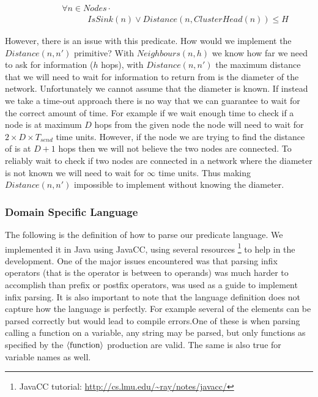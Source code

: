 \begin{align}
\label{eq:hcluster-distance-predicate}
& \hspace{3em}	\forall n \in Nodes \cdot \\
& \hspace{6em}		IsSink(n) \lor Distance(n, ClusterHead(n)) \leq H
\end{align}

However, there is an issue with this predicate. How would we implement the $Distance(n, n')$ primitive? With $Neighbours(n, h)$ we know how far we need to ask for information ($h$ hops), with $Distance(n, n')$ the maximum distance that we will need to wait for information to return from is the diameter of the network. Unfortunately we cannot assume that the diameter is known. If instead we take a time-out approach there is no way that we can guarantee to wait for the correct amount of time. For example if we wait enough time to check if a node is at maximum $D$ hops from the given node the node will need to wait for $2 \times D \times T_{send}$ time units. However, if the node we are trying to find the distance of is at $D + 1 $ hops then we will not believe the two nodes are connected. To reliably wait to check if two nodes are connected in a network where the diameter is not known we will need to wait for $\infty$ time units. Thus making $Distance(n, n')$ impossible to implement without knowing the diameter.


\subsubsection{Domain Specific Language}

The following is the definition of how to parse our predicate language. We implemented it in Java using JavaCC, using several resources \footnote{JavaCC tutorial: \url{http://cs.lmu.edu/~ray/notes/javacc/}} to help in the development. One of the major issues encountered was that parsing infix operators (that is the operator is between to operands) was much harder to accomplish than prefix or postfix operators, \cite{ParsingRecursiveDescent} was used as a guide to implement infix parsing. It is also important to note that the language definition does not capture how the language is perfectly. For example several of the elements can be parsed correctly but would lead to compile errors.One of these is when parsing calling a function on a variable, any string may be parsed, but only functions as specified by the $\langle \textnormal{function} \rangle$ production are valid. The same is also true for variable names as well.

